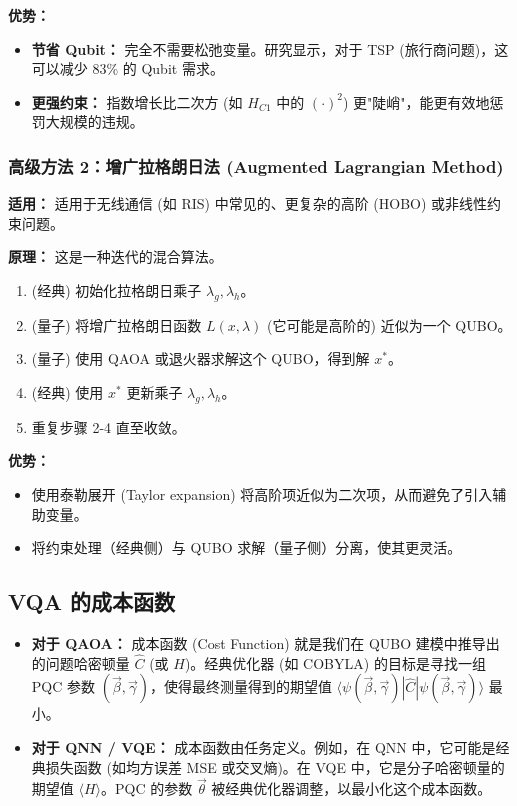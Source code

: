 \documentclass[11pt,a4paper]{article}
\begin{document}
\textbf{优势：}
\begin{itemize}
\item \textbf{节省 Qubit：} 完全不需要松弛变量。研究显示，对于 TSP (旅行商问题)，这可以减少 83\% 的 Qubit 需求。
\item \textbf{更强约束：} 指数增长比二次方 (如 $H_{C1}$ 中的 $(\cdot)^2$) 更"陡峭"，能更有效地惩罚大规模的违规。
\end{itemize}

\subsubsection{高级方法 2：增广拉格朗日法 (Augmented Lagrangian Method)}

\textbf{适用：} 适用于无线通信 (如 RIS) 中常见的、更复杂的高阶 (HOBO) 或非线性约束问题。

\textbf{原理：} 这是一种迭代的混合算法。
\begin{enumerate}
\item (经典) 初始化拉格朗日乘子 $\lambda_g, \lambda_h$。
\item (量子) 将增广拉格朗日函数 $L(x, \lambda)$ (它可能是高阶的) 近似为一个 QUBO。
\item (量子) 使用 QAOA 或退火器求解这个 QUBO，得到解 $x^*$。
\item (经典) 使用 $x^*$ 更新乘子 $\lambda_g, \lambda_h$。
\item 重复步骤 2-4 直至收敛。
\end{enumerate}

\textbf{优势：}
\begin{itemize}
\item 使用泰勒展开 (Taylor expansion) 将高阶项近似为二次项，从而避免了引入辅助变量。
\item 将约束处理（经典侧）与 QUBO 求解（量子侧）分离，使其更灵活。
\end{itemize}

\subsection{VQA 的成本函数}

\begin{itemize}
\item \textbf{对于 QAOA：} 成本函数 (Cost Function) 就是我们在 QUBO 建模中推导出的问题哈密顿量 $\hat{C}$ (或 $H$)。经典优化器 (如 COBYLA) 的目标是寻找一组 PQC 参数 $(\vec{\beta}, \vec{\gamma})$，使得最终测量得到的期望值 $\langle \psi(\vec{\beta}, \vec{\gamma}) | \hat{C} | \psi(\vec{\beta}, \vec{\gamma}) \rangle$ 最小。

\item \textbf{对于 QNN / VQE：} 成本函数由任务定义。例如，在 QNN 中，它可能是经典损失函数 (如均方误差 MSE 或交叉熵)。在 VQE 中，它是分子哈密顿量的期望值 $\langle H \rangle$。PQC 的参数 $\vec{\theta}$ 被经典优化器调整，以最小化这个成本函数。
\end{itemize}
\end{document}
